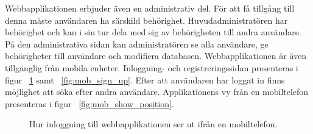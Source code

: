 \documentclass[a4paper,12pt]{article}
\begin{document}
 Webbapplikationen erbjuder även en administrativ del. För att få tillgång till denna måste användaren ha särskild behörighet. Huvudadministratören har behörighet och kan i sin tur dela med sig av behörigheten till andra användare. På den administrativa sidan kan administratören se alla användare, ge behörigheter till användare och modifiera databasen.
 Webbapplikationen är även tillgänglig från mobila enheter. Inloggning- och registreringssidan presenteras i figur ~\ref{fig:mob_login} samt ~\ref{fig:mob_sign_up}. Efter att användaren har loggat in finns möjlighet att söka efter andra användare. Applikationens vy från en mobiltelefon presenteras i figur ~\ref{fig:mob_show_position}.

 \begin{figure}[H]
   \centering
   \caption{Hur inloggning till webbapplikationen ser ut ifrån en mobiltelefon.}
   \label{fig:mob_login}
 \end{figure}
\end{document}
